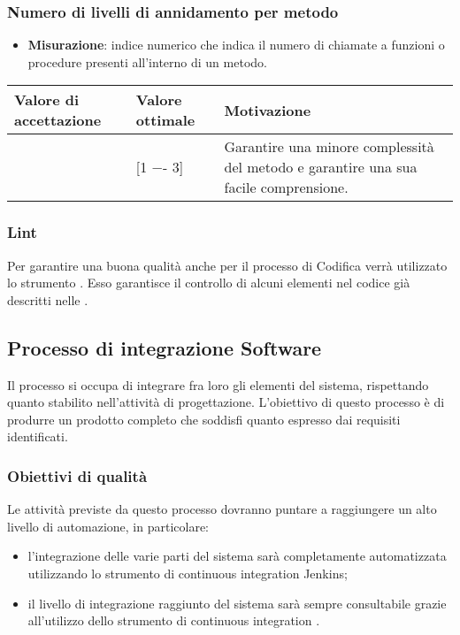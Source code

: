 \subsubsection{Numero di livelli di annidamento per metodo}

\begin{itemize}
\item \textbf{Misurazione}: indice numerico che indica il numero di chiamate a funzioni o procedure presenti all'interno di un metodo.
\end{itemize}

\begin{center}
		\begin{tabular}{|P{2.5cm}|P{2.5cm}|P{6cm}|}
		\hline
			\textbf{Valore di accettazione}	& \textbf{Valore ottimale} & \textbf{Motivazione} \\
			\hline
			[1 -- 5] & [1 −- 3] &	Garantire una minore complessità del metodo e garantire una sua facile comprensione. \\
			\hline
			\end{tabular}
\end{center}


\subsubsection{Lint}

Per garantire una buona qualità anche per il processo di Codifica verrà utilizzato lo strumento . Esso garantisce il controllo di alcuni elementi nel codice già descritti nelle \NdP.



\subsection{Processo di integrazione Software}
Il processo si occupa di integrare fra loro gli elementi del sistema, rispettando quanto stabilito nell'attività di progettazione. L'obiettivo di questo processo è di produrre un prodotto completo che soddisfi quanto espresso dai requisiti identificati.

\subsubsection{Obiettivi di qualità}
Le attività previste da questo processo dovranno puntare a raggiungere un alto livello di automazione, in particolare:
\begin{itemize}
\item l'integrazione delle varie parti del sistema sarà completamente automatizzata utilizzando lo strumento di continuous integration Jenkins;
\item il livello di integrazione raggiunto del sistema sarà sempre consultabile grazie all'utilizzo dello strumento di continuous integration .
\end{itemize}

